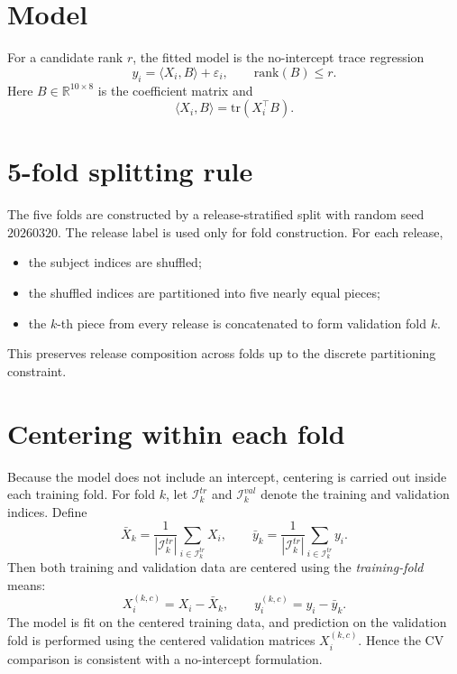 \documentclass[11pt]{article}
\begin{document}
\section{Model}
For a candidate rank \(r\), the fitted model is the no-intercept trace regression
\[
y_i=\langle X_i,B\rangle+\varepsilon_i,\qquad \mathrm{rank}(B)\le r.
\]
Here \(B\in\mathbb{R}^{10\times 8}\) is the coefficient matrix and
\[
\langle X_i,B\rangle=\mathrm{tr}(X_i^\top B).
\]

\section{5-fold splitting rule}
The five folds are constructed by a release-stratified split with random seed \(20260320\). The release label is used only for fold construction. For each release,
\begin{itemize}[leftmargin=2em]
    \item the subject indices are shuffled;
    \item the shuffled indices are partitioned into five nearly equal pieces;
    \item the \(k\)-th piece from every release is concatenated to form validation fold \(k\).
\end{itemize}
This preserves release composition across folds up to the discrete partitioning constraint.

\section{Centering within each fold}
Because the model does not include an intercept, centering is carried out inside each training fold.
For fold \(k\), let \(\mathcal I_k^{tr}\) and \(\mathcal I_k^{val}\) denote the training and validation indices. Define
\[
\bar X_k=\frac{1}{|\mathcal I_k^{tr}|}\sum_{i\in\mathcal I_k^{tr}}X_i,\qquad
\bar y_k=\frac{1}{|\mathcal I_k^{tr}|}\sum_{i\in\mathcal I_k^{tr}}y_i.
\]
Then both training and validation data are centered using the \emph{training-fold} means:
\[
X_i^{(k,c)}=X_i-\bar X_k,\qquad
y_i^{(k,c)}=y_i-\bar y_k.
\]
The model is fit on the centered training data, and prediction on the validation fold is performed using the centered validation matrices
\(X_i^{(k,c)}\). Hence the CV comparison is consistent with a no-intercept formulation.
\end{document}
